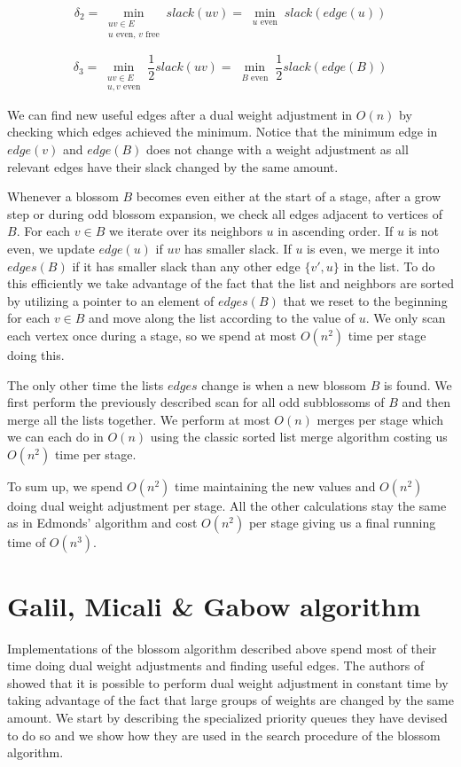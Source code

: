 \[\delta_2=\min_{\substack{uv\in E \\ \text{$u$ even, $v$ free}}} slack(uv) = \min_{\substack{u \text{ even}}} slack(edge(u))\] 

\[\delta_3=\min_{\substack{uv\in E \\ \text{$u, v$ even}}} \frac{1}{2}slack(uv) = \min_{\substack{B \text{ even}}} \frac{1}{2}slack(edge(B))\] 

We can find new useful edges after a dual weight adjustment in $O(n)$ by checking which edges achieved the minimum. Notice that the minimum edge in $edge(v)$ and $edge(B)$ does not change with a weight adjustment as all relevant edges have their slack changed by the same amount.

Whenever a blossom $B$ becomes even either at the start of a stage, after a grow step or during odd blossom expansion, we check all edges adjacent to vertices of $B$. For each $v \in B$ we iterate over its neighbors $u$ in ascending order. If $u$ is not even, we update $edge(u)$ if $uv$ has smaller slack. If $u$ is even, we merge it into $edges(B)$ if it has smaller slack than any other edge $\{v', u\}$ in the list. To do this efficiently we take advantage of the fact that the list and neighbors are sorted by utilizing a pointer to an element of $edges(B)$ that we reset to the beginning for each $v \in B$ and move along the list according to the value of $u$. We only scan each vertex once during a stage, so we spend at most $O(n^2)$ time per stage doing this.

The only other time the lists $edges$ change is when a new blossom $B$ is found. We first perform the previously described scan for all odd subblossoms of $B$ and then merge all the lists together. We perform at most $O(n)$ merges per stage which we can each do in $O(n)$ using the classic sorted list merge algorithm costing us $O(n^2)$ time per stage.

To sum up, we spend $O(n^2)$ time maintaining the new values and $O(n^2)$ doing dual weight adjustment per stage. All the other calculations stay the same as in Edmonds' algorithm and cost $O(n^2)$ per stage giving us a final running time of $O(n^3)$.

\section{Galil, Micali \& Gabow algorithm}

Implementations of the blossom algorithm described above spend most of their time doing dual weight adjustments and finding useful edges. The authors of~\cite{micali1980v} showed that it is possible to perform dual weight adjustment in constant time by taking advantage of the fact that large groups of weights are changed by the same amount. We start by describing the specialized priority queues they have devised to do so and we show how they are used in the search procedure of the blossom algorithm.

